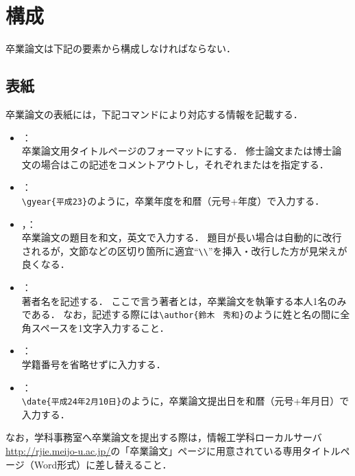 \documentclass[a4j,11pt]{ujreport}
\begin{document}
\section{構成}
\label{sec:Structure}

卒業論文は下記の要素から構成しなければならない．

\subsection{表紙}
\label{subsec:TitlePage}
卒業論文の表紙には，下記コマンドにより対応する情報を記載する．

\begin{itemize}
\item {}：\mbox{}\\
卒業論文用タイトルページのフォーマットにする．
修士論文または博士論文の場合はこの記述をコメントアウトし，それぞれまたはを指定する．

\item {}：\mbox{}\\
\verb|\gyear{平成23}|のように，卒業年度を和暦（元号+年度）で入力する．

\item {}，：\mbox{}\\
卒業論文の題目を和文，英文で入力する．
題目が長い場合は自動的に改行されるが，文節などの区切り箇所に適宜``\verb|\\|''を挿入・改行した方が見栄えが良くなる．

\item {}：\mbox{}\\
著者名を記述する．
ここで言う著者とは，卒業論文を執筆する本人1名のみである．
なお，記述する際には\verb|\author{鈴木　秀和}|のように姓と名の間に全角スペースを1文字入力すること．

\item {}：\mbox{}\\
学籍番号を省略せずに入力する．

\item {}：\mbox{}\\
\verb|\date{平成24年2月10日}|のように，卒業論文提出日を和暦（元号+年月日）で入力する．
\end{itemize}

\begin{boxnote}
なお，学科事務室へ卒業論文を提出する際は，情報工学科ローカルサーバ\url{http://rjie.meijo-u.ac.jp/}の「卒業論文」ページに用意されている専用タイトルページ（Word形式）に差し替えること．
\end{boxnote}
\end{document}
